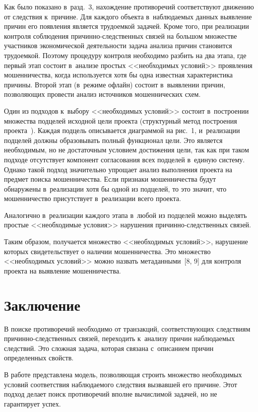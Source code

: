\begin{multicols}{2}
  Как было показано в~разд.~3, нахождение противоречий соответствуют 
движению от следствия к~причине. Для каждого объекта в~наблюдаемых данных 
выявление причин его появления является трудоемкой задачей. Кроме того, при 
реализации контроля соблюдения при\-чин\-но-след\-ст\-вен\-ных связей на 
большом множестве участников экономической деятельности задача анализа 
причин становится трудоемкой. Поэтому процедуру контроля необходимо разбить 
на два этапа, где первый этап состоит в~анализе простых <<необходимых 
условий>> проявления мошенничества, когда используется хотя бы одна 
известная характеристика причины. Второй этап (в~режиме офлайн) состоит 
в~выявлении причин, позволяющих провести анализ источников мошеннических 
схем. 
  
  Один из подходов к~выбору <<необходимых условий>> состоит в~построении 
множества подцелей исходной цели проекта (структурный метод построения 
проекта~\cite{7-gr}). Каждая подцель описывается диаграммой на рис.~1, 
и~реализации подцелей должны образовывать полный функционал цели. Это 
является необходимым, но не достаточным условием достижения цели, так как 
при таком подходе отсутствует компонент согласования всех подцелей в~единую 
систему. Однако такой подход значительно упрощает анализ выполнения проекта 
на предмет поиска мошенничества. Если признаки мошенничества будут 
обнаружены в~реализации хотя бы одной из подцелей, то это значит, что 
мошенничество присутствует в~реализации всего проекта. 
  
  Аналогично в~реализации каждого этапа в~любой из подцелей можно выделять 
простые <<необходимые условия>> нарушения при\-чин\-но-след\-ст\-венн\-ых 
связей. 
  
  Таким образом, получается множество <<необходимых условий>>, нарушение 
которых свидетельствует о наличии мошенничества. Это множество 
<<необходимых условий>> можно назвать метаданными~[8, 9] для контроля 
проекта на выявление мошенничества. 
  
  
  \section{Заключение }
  
  В поиске противоречий необходимо от транзакций, соответствующих 
следствиям при\-чин\-но-след\-ст\-вен\-ных связей, переходить к~анализу причин 
наблюдаемых следствий. Это сложная задача, которая связана с~описанием причин 
определенных свойств. 
  
  В работе представлена модель, позволяющая строить множество необходимых 
условий соответствия наблюдаемого следствия вызвавшей его причине. Этот 
подход делает поиск противоречий вполне вычислимой задачей, но не гарантирует 
успех. 
  

\end{multicols}
